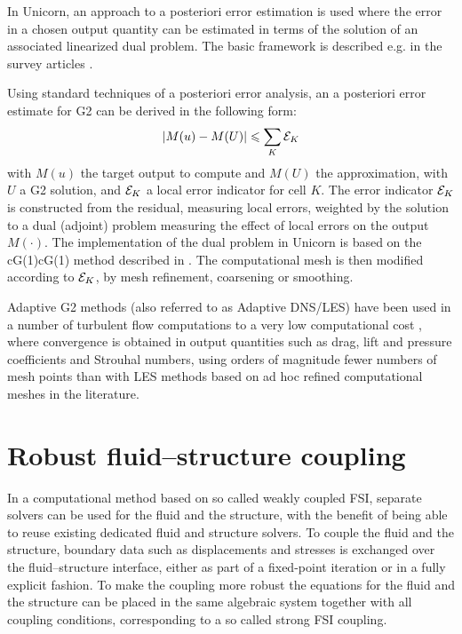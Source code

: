 In Unicorn, an approach to a posteriori error estimation is used where the error in a chosen output quantity can be estimated in terms of the solution of an associated linearized dual problem. The basic framework is described e.g. in the survey articles \citep{ErikssonEstepEtAl1995,BeckerRannacher2001,GilesSuli2002}.

Using standard techniques of a posteriori error analysis, an a posteriori error estimate for G2 can be derived in the following form:
\begin{equation}
\vert M(u) - M(U) \vert \leqslant \sum_K {\cal E}_K
\end{equation}
with $M(u)$ the target output to compute and $M(U)$ the approximation, with $U$ a G2 solution, and ${\cal E}_K$ a local error indicator for cell $K$.
The error indicator ${\cal E}_K$ is constructed from the residual, measuring local errors,
weighted by the solution to a dual (adjoint) problem measuring the effect of local errors
on the output $M(\cdot)$. The implementation of the dual problem in Unicorn is based on the cG(1)cG(1) method described in \citet{HoffmanJohnson2007}. The computational mesh is then modified according to $ {\cal E}_K$, by mesh refinement, coarsening or smoothing.

Adaptive G2 methods (also referred to as Adaptive DNS/LES) have been used in a number of turbulent flow computations to a very low computational cost \citep{Hoffman2005,HoffmanJohnson2006b,Hoffman2006,Hoffman2009,HoffmanJansson2009,VilelaJanssonEtAl2010}, where convergence is obtained in output quantities such as drag, lift and pressure coefficients and Strouhal numbers, using orders of magnitude fewer numbers of mesh points than with LES methods based on ad hoc refined computational meshes in the literature.

\section{Robust fluid--structure coupling}

In a computational method based on so called weakly coupled FSI, separate solvers can be used for the fluid and the structure, with the benefit of being able to reuse existing dedicated fluid and structure solvers. To couple the fluid and the structure, boundary data such as displacements and stresses is exchanged over the fluid--structure interface, either as part of a fixed-point iteration or in a fully explicit fashion. To make the coupling more robust the equations for the fluid and the structure can be placed in the same algebraic system together with all coupling conditions, corresponding to a so called strong FSI coupling.

